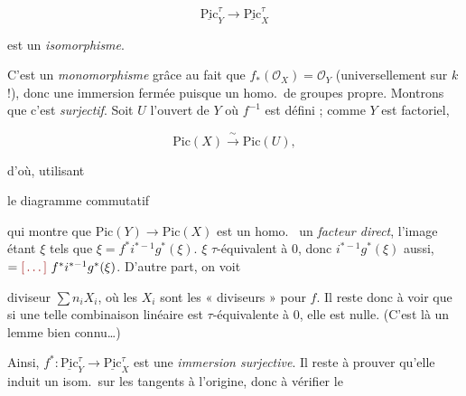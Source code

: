 \documentclass[11pt,a4paper]{article}
\begin{document}
\[ \underline{\mathrm{Pic}}^{\tau}_Y \longrightarrow
   \underline{\mathrm{Pic}}^{\tau}_X \]

est un \emph{isomorphisme}.


C'est un \emph{monomorphisme} grâce au fait que
$f_{*}(\mathcal{O}_X) = \mathcal{O}_Y$ (universellement sur $k$ !), donc une
immersion fermée puisque un homo.\ de groupes \ill{} \ill{} propre. Montrons
que c'est \emph{surjectif}. Soit $U$ l'ouvert de $Y$ où $f^{-1}$ est défini ;
comme $Y$ est factoriel, \ill{}

\[ \mathrm{Pic}(X) \xrightarrow{\ \sim\ } \mathrm{Pic}(U), \]

d'où, utilisant


le diagramme commutatif


qui montre que $\mathrm{Pic}(Y) \to \mathrm{Pic}(X)$ est un homo.\ \ill{} un
\emph{facteur direct}, l'image étant \ill{} $\xi$ tels que
 $\xi = f^{*} i^{*-1} g^{*}(\xi)$. \ill{} $\xi$
\ill{} $\tau$-équivalent à 0, donc $i^{*-1} g^{*}(\xi)$ aussi,
\struck{\ill{}} \ill{} $= \ill{}\ f^{*} i^{*-1} g^{*}(\xi)$. D'autre part, on
voit \ill{}


diviseur $\sum n_i X_i$, où les $X_i$ sont les « diviseurs
 » pour $f$. Il reste donc à voir que si une telle
combinaison linéaire est  $\tau$-équivalente à 0, elle
est nulle.  (C'est là un lemme bien connu\ldots)


Ainsi, $f^{*} : \underline{\mathrm{Pic}}^{\tau}_Y \to
\underline{\mathrm{Pic}}^{\tau}_X$ est une \emph{immersion surjective}. Il
reste à prouver qu'elle induit un isom.\ sur les \ill{} tangents à
l'origine, donc à vérifier le
\end{document}
